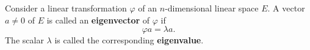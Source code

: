 Consider a linear transformation $\varphi$ of an $n$-dimensional linear space $E$. A vector $a \neq 0$ of $E$ is called an \textbf{eigenvector} of $\varphi$ if
$$\varphi a = \lambda a.$$
The scalar $\lambda$ is called the corresponding \textbf{eigenvalue}.
